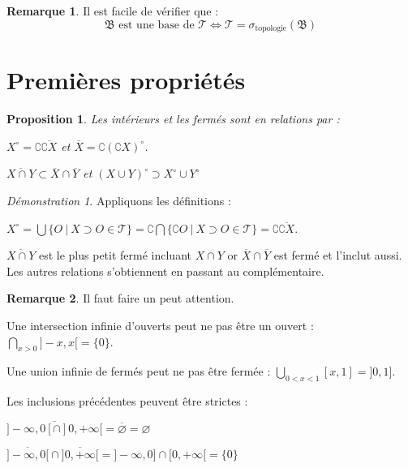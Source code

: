 \documentclass[a4paper, 11pt, french]{book}
\newenvironment{itemise}{\itemize}{\enditemize}
\theoremstyle{plain} %
\newtheorem{proposition}{Proposition}
\theoremstyle{definition} %
\newtheorem{remarque}{Remarque}
\theoremstyle{remark} %
\newtheorem*{demonstration}{Démonstration}
\newcommand{\1}{\mathds{1}}
\newcommand\vide{\varnothing}
\newcommand\ens[2]{\{#1 \ |\ #2\}}
\begin{document}
\begin{remarque}
	Il est facile de vérifier que :
	$$
	\text{$\mathfrak{B}$ est une base de $\mathscr{T}$}
	\iff
	\mathscr{T}=\sigma_\text{topologie}(\mathfrak{B})
	$$
\end{remarque}

\section{Premières propriétés}

\begin{proposition}
	Les intérieurs et les fermés sont en relations par :
	\begin{itemise}
		\item $X^\circ=\complement\overline{\complement X}$ et $\overline{X}=\complement(\complement X)^\circ$.
		\item $\overline{X\cap Y}\subset\overline{X}\cap\overline{Y}$ et $(X\cup Y)^\circ\supset X^\circ\cup Y^\circ$
	\end{itemise}
\end{proposition}

\begin{demonstration}
	Appliquons les définitions :
	\begin{itemise}
		\item $X^\circ
			=\bigcup\ens{O}{X\supset O\in\mathscr{T}}
			=\complement\bigcap\ens{\complement O}{X\supset O\in\mathscr{T}}
			=\complement\overline{\complement X}$.
		\item $\overline{X\cap Y}$ est le plus petit fermé incluant $X\cap Y$ or $\overline{X}\cap\overline{Y}$ est fermé et l'inclut aussi.
	\end{itemise}
	Les autres relations s'obtiennent en passant au complémentaire.
\end{demonstration}

\begin{remarque}
	Il faut faire un peut attention.
	\begin{itemise}
		\item Une intersection infinie d'ouverts peut ne pas être un ouvert : $\bigcap_{x>0}]-x,x[=\{0\}$.
		\item Une union infinie de fermés peut ne pas être fermée : $\bigcup_{0<x<1}[x,1]=]0, 1]$.
		\item Les inclusions précédentes peuvent être strictes :
		\begin{itemise}
			\item $\overline{]-\infty, 0[\cap]0, +\infty[}=\overline{\vide}=\vide$
			\item $\overline{]-\infty, 0[}\cap\overline{]0, +\infty[}=]-\infty, 0]\cap[0, +\infty[=\{0\}$
		\end{itemise}
	\end{itemise}
\end{remarque}
\end{document}
